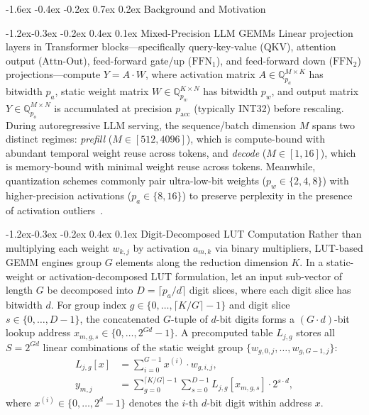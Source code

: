 \documentclass[10pt,letterpaper,twocolumn]{article}
\makeatletter
\renewcommand\section{\@startsection {section}{1}{\z@}%
  {-1.6ex \@plus -0.4ex \@minus -0.2ex}%
  {0.7ex \@plus 0.2ex}%
  {\normalfont\large\bfseries\color{primary}}}
\renewcommand\subsection{\@startsection{subsection}{2}{\z@}%
  {-1.2ex\@plus -0.3ex \@minus -0.2ex}%
  {0.4ex \@plus 0.1ex}%
  {\normalfont\normalsize\bfseries}}
\makeatother
\begin{document}
\section{Background and Motivation}

\subsection{Mixed-Precision LLM GEMMs}
Linear projection layers in Transformer blocks---specifically query-key-value ($\text{QKV}$), attention output ($\text{Attn-Out}$), feed-forward gate/up ($\text{FFN}_{1}$), and feed-forward down ($\text{FFN}_{2}$) projections---compute $Y = A \cdot W$, where activation matrix $A \in \mathbb{Q}_{p_a}^{M \times K}$ has bitwidth $p_a$, static weight matrix $W \in \mathbb{Q}_{p_w}^{K \times N}$ has bitwidth $p_w$, and output matrix $Y \in \mathbb{Q}_{p_o}^{M \times N}$ is accumulated at precision $p_{\text{acc}}$ (typically INT32) before rescaling. During autoregressive LLM serving, the sequence/batch dimension $M$ spans two distinct regimes: \emph{prefill} ($M \in [512, 4096]$), which is compute-bound with abundant temporal weight reuse across tokens, and \emph{decode} ($M \in [1, 16]$), which is memory-bound with minimal weight reuse across tokens. Meanwhile, quantization schemes commonly pair ultra-low-bit weights ($p_w \in \{2, 4, 8\}$) with higher-precision activations ($p_a \in \{8, 16\}$) to preserve perplexity in the presence of activation outliers~\cite{lin2024awq,xiao2023smoothquant}.

\subsection{Digit-Decomposed LUT Computation}
Rather than multiplying each weight $w_{k,j}$ by activation $a_{m,k}$ via binary multipliers, LUT-based GEMM engines group $G$ elements along the reduction dimension $K$. In a static-weight or activation-decomposed LUT formulation, let an input sub-vector of length $G$ be decomposed into $D = \lceil p_a / d \rceil$ digit slices, where each digit slice has bitwidth $d$. For group index $g \in \{0, \dots, \lceil K/G \rceil - 1\}$ and digit slice $s \in \{0, \dots, D-1\}$, the concatenated $G$-tuple of $d$-bit digits forms a $(G \cdot d)$-bit lookup address $x_{m,g,s} \in \{0, \dots, 2^{Gd}-1\}$. A precomputed table $L_{j,g}$ stores all $S = 2^{Gd}$ linear combinations of the static weight group $\{w_{g,0,j}, \dots, w_{g,G-1,j}\}$:
\begin{equation}
  \begin{aligned}
    L_{j,g}[x] &= \sum_{i=0}^{G-1} x^{(i)} \cdot w_{g,i,j}, \\
    y_{m,j}    &= \sum_{g=0}^{\lceil K/G \rceil - 1} \sum_{s=0}^{D-1} L_{j,g}[x_{m,g,s}] \cdot 2^{s \cdot d},
  \end{aligned}
  \label{eq:lut_gemm}
\end{equation}
where $x^{(i)} \in \{0, \dots, 2^d - 1\}$ denotes the $i$-th $d$-bit digit within address $x$.
\end{document}
